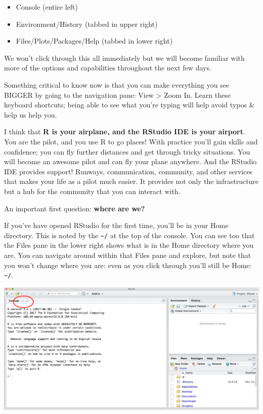 \documentclass[]{book}
\providecommand{\tightlist}{%
  \setlength{\itemsep}{0pt}\setlength{\parskip}{0pt}}
\begin{document}
\begin{itemize}
\tightlist
\item
  Console (entire left)
\item
  Environment/History (tabbed in upper right)
\item
  Files/Plots/Packages/Help (tabbed in lower right)
\end{itemize}

We won't click through this all immediately but we will become familiar with more of the options and capabilities throughout the next few days.

Something critical to know now is that you can make everything you see BIGGER by going to the navigation pane: View \textgreater{} Zoom In. Learn these keyboard shortcuts; being able to see what you're typing will help avoid typos \& help us help you.

I think that \textbf{R is your airplane, and the RStudio IDE is your airport}. You are the pilot, and you use R to go places! With practice you'll gain skills and confidence; you can fly further distances and get through tricky situations. You will become an awesome pilot and can fly your plane anywhere. And the RStudio IDE provides support! Runways, communication, community, and other services that makes your life as a pilot much easier. It provides not only the infrastructure but a hub for the community that you can interact with.

An important first question: \textbf{where are we?}

If you've have opened RStudio for the first time, you'll be in your Home directory. This is noted by the \texttt{\textasciitilde{}/} at the top of the console. You can see too that the Files pane in the lower right shows what is in the Home directory where you are. You can navigate around within that Files pane and explore, but note that you won't change where you are: even as you click through you'll still be Home: \texttt{\textasciitilde{}/}.

\includegraphics[width=0.8\linewidth]{img/RStudio_IDE_homedir}
\end{document}
